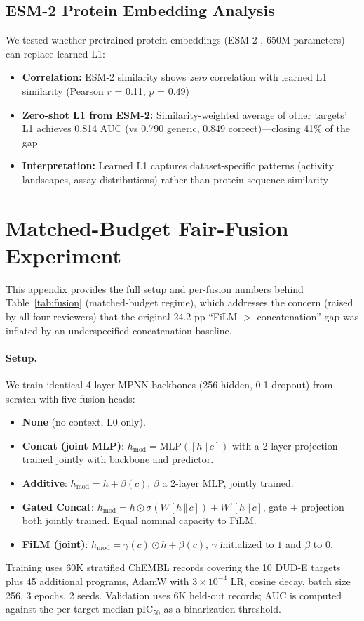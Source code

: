 \documentclass{article}
\begin{document}
\subsection{ESM-2 Protein Embedding Analysis}

We tested whether pretrained protein embeddings (ESM-2 \citep{lin_2023_esm2}, 650M parameters) can replace learned L1:

\begin{itemize}[noitemsep,topsep=0pt]
\item \textbf{Correlation:} ESM-2 similarity shows \textit{zero} correlation with learned L1 similarity (Pearson $r$ = 0.11, $p$ = 0.49)
\item \textbf{Zero-shot L1 from ESM-2:} Similarity-weighted average of other targets' L1 achieves 0.814 AUC (vs 0.790 generic, 0.849 correct)---closing 41\% of the gap
\item \textbf{Interpretation:} Learned L1 captures dataset-specific patterns (activity landscapes, assay distributions) rather than protein sequence similarity
\end{itemize}

\section{Matched-Budget Fair-Fusion Experiment}
\label{app:fair_fusion}

This appendix provides the full setup and per-fusion numbers behind Table~\ref{tab:fusion} (matched-budget regime), which addresses the concern (raised by all four reviewers) that the original 24.2 pp ``FiLM $>$ concatenation'' gap was inflated by an underspecified concatenation baseline.

\paragraph{Setup.} We train identical 4-layer MPNN backbones (256 hidden, 0.1 dropout) from scratch with five fusion heads:
\begin{itemize}[noitemsep,topsep=0pt]
\item \textbf{None} (no context, L0 only).
\item \textbf{Concat (joint MLP)}: $h_{\text{mod}} = \text{MLP}([h \,\Vert\, c])$ with a 2-layer projection trained jointly with backbone and predictor.
\item \textbf{Additive}: $h_{\text{mod}} = h + \beta(c)$, $\beta$ a 2-layer MLP, jointly trained.
\item \textbf{Gated Concat}: $h_{\text{mod}} = h \odot \sigma(W[h\,\Vert\,c]) + W'[h\,\Vert\,c]$, gate $+$ projection both jointly trained. Equal nominal capacity to FiLM.
\item \textbf{FiLM (joint)}: $h_{\text{mod}} = \gamma(c) \odot h + \beta(c)$, $\gamma$ initialized to $1$ and $\beta$ to $0$.
\end{itemize}
Training uses 60K stratified ChEMBL records covering the 10 DUD-E targets plus 45 additional programs, AdamW with $3\times 10^{-4}$ LR, cosine decay, batch size 256, 3 epochs, 2 seeds. Validation uses 6K held-out records; AUC is computed against the per-target median pIC$_{50}$ as a binarization threshold.
\end{document}
